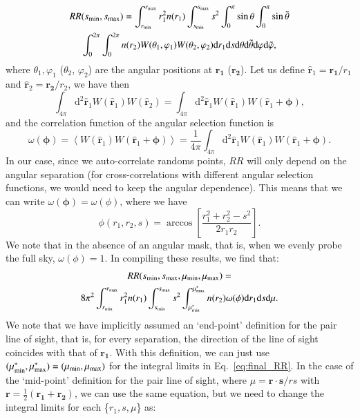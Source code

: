 \documentclass{aa}
\newcommand{\ev}[1]{\left\langle #1 \right\rangle}
\newcommand{\dd}{\mathrm{d}}
\begin{document}
%
\begin{multline}
 RR(s_{\rm min}, s_{\rm max}) = 
  \int_{r_{\rm min}}^{r_{\rm max}}r_1^2 n(r_1)\int_{s_{\rm min}}^{s_{\rm max}}s^2\int_{0}^{\pi}\sin{\theta}\int_{0}^{\pi}\sin{\tilde{\theta}} \\
  \int_{0}^{2\pi}\int_{0}^{2\pi} n(r_2)W(\theta_1, \varphi_1)W(\theta_2, \varphi_2)\dd r_1\dd s\dd\theta\dd\tilde{\theta}\dd\varphi\dd\tilde{\varphi},
\end{multline}
%
where $\theta_1, \varphi_1$ ($\theta_2$, $\varphi_2$) are the angular positions at $\bm{r_1}$ ($\bm{r_2}$). 
Let us define $\hat{\bm{r}}_1 = \bm{r_1}/r_1$ and $\hat{\bm{r}}_2 = \bm{r_2}/r_2$, we have then
%
\begin{equation}
\int_{4\pi}\dd^2\hat{\bm{r}}_1W(\hat{\bm{r}}_1)W(\hat{\bm{r}}_2) = \int_{4\pi}\dd^2\hat{\bm{r}}_1W(\hat{\bm{r}}_1 )W(\hat{\bm{r}}_1+\bm{\phi}),
\end{equation}
%
and the correlation function of the angular selection function is
\begin{equation}
    \omega(\bm{\phi}) = \ev{W(\hat{\bm{r}}_1)W(\hat{\bm{r}}_1+\bm{\phi})} = \frac{1}{4\pi}\int_{4\pi}\dd^2\hat{\bm{r}}_1W(\hat{\bm{r}}_1)W(\hat{\bm{r}}_1+\bm{\phi}).
\end{equation}
In our case, since we auto-correlate randoms points, $RR$ will only depend on the angular separation (for cross-correlations with different angular selection functions, we would need to keep the angular dependence). This means that we can write $\omega(\bm{\phi}) = \omega(\phi)$, where we have
%
\begin{equation}
    \phi(r_1, r_2, s) = \arccos\left[\frac{r_1^2+r_2^2-s^2}{2r_1r_2}\right].
\end{equation}
%
We note that in the absence of an angular mask, that is, when we evenly probe the full sky, $\omega(\phi) = 1$. In compiling these results, we find that:
%
\begin{multline}
  RR(s_{\rm min}, s_{\rm max}, \mu_{\rm min}, \mu_{\rm max})  = \\
  8\pi^2\int_{r_{\rm min}}^{r_{\rm max}}r_1^2 n(r_1)\int_{s_{\rm min}}^{s_{\rm max}}s^2\int_{\mu^*_{\rm min}}^{\mu^*_{\rm max}} n(r_2)\omega(\phi)\dd r_1\dd s\dd\mu.
  \label{eq:final_RR}
\end{multline}
%
We note that we have implicitly assumed an `end-point' definition for the pair line of sight, that is, for every separation, the direction of the line of sight coincides with that of $\bm{r_1}$. With this definition, we can just use $(\mu^*_{\rm min},\mu^*_{\rm max}) = ( \mu_{\rm min},\mu_{\rm max})$ for the integral limits in Eq.~\eqref{eq:final_RR}. In the case of the `mid-point' definition for the pair line of sight, where $\mu = \bm{r}\cdot\bm{s}/rs$ with $\bm{r} = \frac{1}{2}(\bm{r_1}+\bm{r_2})$, we can use the same equation, but we need to change the integral limits for each \{$r_1, s, \mu$\} as:
\end{document}
